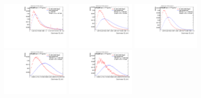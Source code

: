 \begin{figure}
\includegraphics[width=0.3\textwidth]{sascha_input/Appendix/Distributions/higgs/distributions/beta2/h_recoJet_C2_2_bin1.pdf} \hspace{1mm}
\includegraphics[width=0.3\textwidth]{sascha_input/Appendix/Distributions/higgs/distributions/beta2/h_recoJet_C2_2_bin2.pdf} \hspace{4mm}
\includegraphics[width=0.3\textwidth]{sascha_input/Appendix/Distributions/higgs/distributions/beta2/h_recoJet_C2_2_bin3.pdf} 
\bigskip
\includegraphics[width=0.3\textwidth]{sascha_input/Appendix/Distributions/higgs/distributions/beta2/h_recoJet_C2_2_bin4.pdf} \hspace{4mm}
\includegraphics[width=0.3\textwidth]{sascha_input/Appendix/Distributions/higgs/distributions/beta2/h_recoJet_C2_2_bin5.pdf} 


\end{figure}
